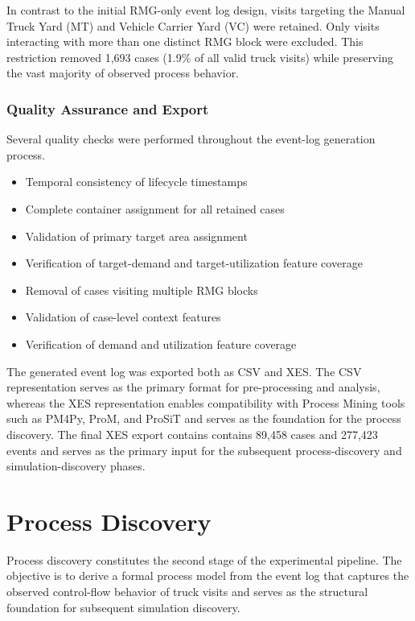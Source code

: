         In contrast to the initial RMG-only event log design, visits targeting the Manual Truck Yard (MT) and Vehicle Carrier Yard (VC) were retained. Only visits interacting with more than one distinct RMG block were excluded. This restriction removed 1,693 cases (1.9\% of all valid truck visits) while preserving the vast majority of observed process behavior.

        \subsubsection{Quality Assurance and Export} Several quality checks were performed throughout the event-log generation process. 
        \begin{itemize} 
        \item Temporal consistency of lifecycle timestamps 
        \item Complete container assignment for all retained cases 
        \item Validation of primary target area assignment 
        \item Verification of target-demand and target-utilization feature coverage 
        \item Removal of cases visiting multiple RMG blocks
        \item Validation of case-level context features 
        \item Verification of demand and utilization feature coverage 
        \end{itemize} 
        The generated event log was exported both as CSV and XES. The CSV representation serves as the primary format for pre-processing and analysis, whereas the XES representation enables compatibility with Process Mining tools such as PM4Py, ProM, and ProSiT and serves as the foundation for the process discovery. The final XES export contains contains 89,458 cases and 277,423 events and serves as the primary input for the subsequent process-discovery and simulation-discovery phases.
        
\section{Process Discovery}

Process discovery constitutes the second stage of the experimental pipeline. The objective is to derive a formal process model from the event log that captures the observed control-flow behavior of truck visits and serves as the structural foundation for subsequent simulation discovery.

